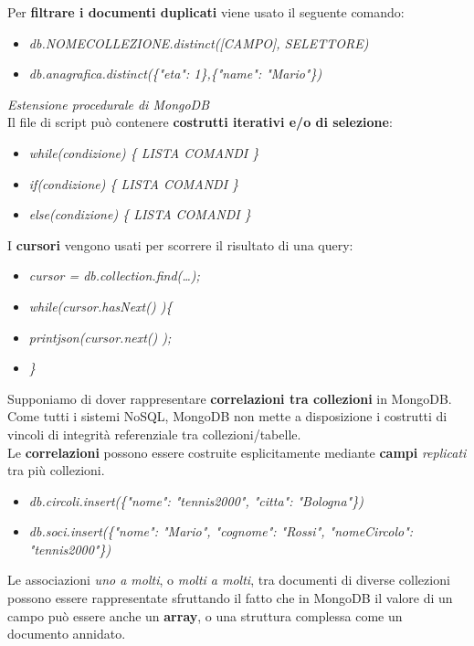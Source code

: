 \documentclass{article}
\begin{document}
Per \textbf{filtrare i documenti duplicati} viene usato il seguente comando:
\begin{itemize}[label={ }, leftmargin=1cm]
    \itemsep0em
    \item \textit{db.NOMECOLLEZIONE.distinct([CAMPO], SELETTORE)}
    \item \textit{db.anagrafica.distinct(\{"eta": 1\},\{"name": "Mario"\})}\vspace{14pt}\\
\end{itemize}
\textit{Estensione procedurale di MongoDB}\\
Il file di script può contenere \textbf{costrutti iterativi e/o di selezione}:
\begin{itemize}[label={ }, leftmargin=1cm]
    \itemsep0em
    \item \textit{while(condizione) \{ LISTA COMANDI \}}
    \item \textit{if(condizione) \{ LISTA COMANDI \}}
    \item \textit{else(condizione) \{ LISTA COMANDI \}}
\end{itemize}
I \textbf{cursori} vengono usati per scorrere il risultato di una query:
\begin{itemize}[label={ }, leftmargin=1cm]
    \itemsep0em
    \item \textit{cursor = db.collection.find(\dots);}
    \item \textit{while(cursor.hasNext() )\{}
    \item \quad \textit{printjson(cursor.next() );}
    \item \textit{\}}\\
\end{itemize}
Supponiamo di dover rappresentare \textbf{correlazioni tra collezioni} in MongoDB. Come tutti i sistemi NoSQL, MongoDB non mette a disposizione i costrutti di vincoli di integrità referenziale tra collezioni/tabelle.\\
Le \textbf{correlazioni} possono essere costruite esplicitamente mediante \textbf{campi} \textit{replicati} tra più collezioni.
\begin{itemize}[label={ }, leftmargin=1cm]
    \itemsep0em
    \item \textit{db.circoli.insert(\{"nome": "tennis2000", "citta": "Bologna"\})}
    \item \textit{db.soci.insert(\{"nome": "Mario", "cognome": "Rossi", "nomeCircolo": "tennis2000"\})}
\end{itemize}
Le associazioni \textit{uno a molti}, o \textit{molti a molti}, tra documenti di diverse collezioni possono essere rappresentate sfruttando il fatto che in MongoDB il valore di un campo può essere anche un \textbf{array}, o una struttura complessa come un documento annidato.
\end{document}
